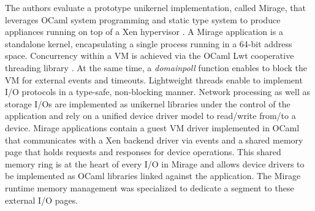 %
%
%
The authors evaluate a prototype unikernel implementation, called Mirage, that leverages OCaml system programming and static type system to produce appliances running on top of a Xen hypervisor \cite{DBLP:conf/sosp/BarhamDFHHHN03}.
A Mirage application is a standalone kernel, encapsulating a single process running in a 64-bit address space.
Concurrency within a VM is achieved via the OCaml Lwt cooperative threading library \cite{DBLP:conf/ml/Vouillon08}.
At the same time, a \emph{domainpoll} function enables to block the VM for external events and timeouts.
Lightweight threads enable to implement I/O protocols in a type-safe, non-blocking manner.
Network processing as well as storage I/Os are implemented as unikernel libraries under the control of the application and rely on a unified device driver model to read/write from/to a device.
Mirage applications contain a guest VM driver implemented in OCaml that communicates with a Xen backend driver via events and a shared memory page that holds requests and responses for device operations.
This shared memory ring is at the heart of every I/O in Mirage and allows device drivers to be implemented as OCaml libraries linked against the application.
The Mirage runtime memory management was specialized to dedicate a segment to these external I/O pages.

